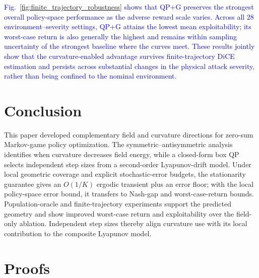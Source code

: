 \documentclass[journal]{IEEEtran}
\theoremstyle{remark}
\begin{document}
\textcolor{blue}{Fig.~\ref{fig:finite_trajectory_robustness} shows that QP+G preserves the strongest overall policy-space performance as the adverse reward scale varies.}
\textcolor{blue}{Across all $28$ environment--severity settings, QP+G attains the lowest mean exploitability; its worst-case return is also generally the highest and remains within sampling uncertainty of the strongest baseline where the curves meet.}
\textcolor{blue}{These results jointly show that the curvature-enabled advantage survives finite-trajectory DiCE estimation and persists across substantial changes in the physical attack severity, rather than being confined to the nominal environment.}
\FloatBarrier

	\section{Conclusion}
	This paper developed complementary field and curvature directions for zero-sum Markov-game policy optimization.
	The symmetric--antisymmetric analysis identifies when curvature decreases field energy, while a closed-form box QP selects independent step sizes from a second-order Lyapunov-drift model.
	Under local geometric coverage and explicit stochastic-error budgets, the stationarity guarantee gives an $O(1/K)$ ergodic transient plus an error floor; with the local policy-space error bound, it transfers to Nash-gap and worst-case-return bounds.
	Population-oracle and finite-trajectory experiments support the predicted geometry and show improved worst-case return and exploitability over the field-only ablation.
	Independent step sizes thereby align curvature use with its local contribution to the composite Lyapunov model.
	
\appendices
	
	\section{Proofs}\label{app:proofs}
\end{document}
